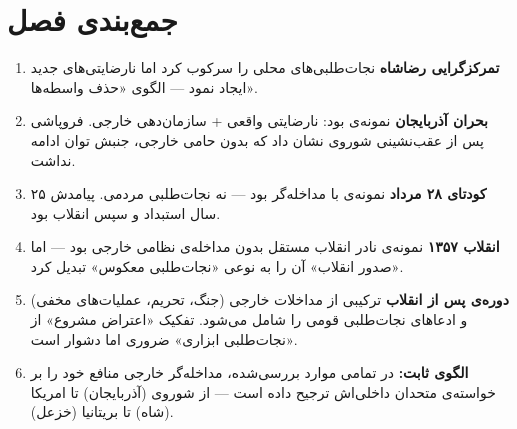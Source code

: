 \section{جمع‌بندی فصل}
\label{sec:ch07-summary}

\begin{tcolorbox}[wavebox, title={یافته‌های کلیدی فصل ۷}]
\begin{enumerate}[nosep, label=\textbf{\arabic*.}]
  \item \textbf{تمرکزگرایی رضاشاه} نجات‌طلبی‌های محلی را سرکوب کرد اما نارضایتی‌های جدید ایجاد نمود — الگوی «حذف واسطه‌ها».

  \item \textbf{بحران آذربایجان} نمونه‌ی  بود: نارضایتی واقعی + سازمان‌دهی خارجی. فروپاشی پس از عقب‌نشینی شوروی نشان داد که بدون حامی خارجی، جنبش توان ادامه نداشت.

  \item \textbf{کودتای ۲۸ مرداد} نمونه‌ی  با مداخله‌گر بود — نه نجات‌طلبی مردمی. پیامدش ۲۵ سال استبداد و سپس انقلاب بود.

  \item \textbf{انقلاب ۱۳۵۷} نمونه‌ی نادر انقلاب مستقل بدون مداخله‌ی نظامی خارجی بود — اما «صدور انقلاب» آن را به نوعی «نجات‌طلبی معکوس» تبدیل کرد.

  \item \textbf{دوره‌ی پس از انقلاب} ترکیبی از مداخلات خارجی (جنگ، تحریم، عملیات‌های مخفی) و ادعاهای نجات‌طلبی قومی را شامل می‌شود. تفکیک «اعتراض مشروع» از «نجات‌طلبی ابزاری» ضروری اما دشوار است.

  \item \textbf{الگوی ثابت:} در تمامی موارد بررسی‌شده، مداخله‌گر خارجی منافع خود را بر خواسته‌ی متحدان داخلی‌اش ترجیح داده است — از شوروی (آذربایجان) تا امریکا (شاه) تا بریتانیا (خزعل).
\end{enumerate}
\end{tcolorbox}

\cleardoublepage